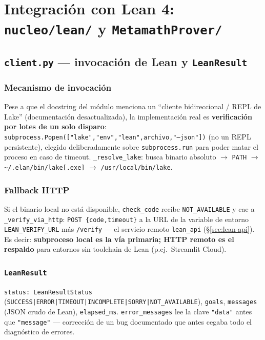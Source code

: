 \documentclass[11pt,a4paper]{report}
\newcommand{\code}[1]{\texttt{#1}}
\begin{document}
\chapter{Integraci\'on con Lean 4: \code{nucleo/lean/} y \code{MetamathProver/}}

\section{\code{client.py} --- invocaci\'on de Lean y \code{LeanResult}}

\subsection{Mecanismo de invocaci\'on}
Pese a que el docstring del m\'odulo menciona un ``cliente bidireccional / REPL de Lake'' (documentaci\'on desactualizada), la implementaci\'on real es \textbf{verificaci\'on por lotes de un solo disparo}: \code{subprocess.Popen(["lake","env","lean",archivo,"--json"])} (no un REPL persistente), elegido deliberadamente sobre \code{subprocess.run} para poder matar el proceso en caso de timeout. \code{\_resolve_lake}: busca binario absoluto $\to$ \code{PATH} $\to$ \code{\textasciitilde/.elan/bin/lake[.exe]} $\to$ \code{/usr/local/bin/lake}.

\subsection{Fallback HTTP}
Si el binario local no est\'a disponible, \code{check_code} recibe \code{NOT_AVAILABLE} y cae a \code{_verify_via_http}: \code{POST \{code,timeout\}} a la URL de la variable de entorno \code{LEAN_VERIFY_URL} más \code{/verify} --- el servicio remoto \code{lean_api} (\S\ref{sec:lean-api}). Es decir: \textbf{subproceso local es la v\'ia primaria; HTTP remoto es el respaldo} para entornos sin toolchain de Lean (p.ej.\ Streamlit Cloud).

\subsection{\code{LeanResult}}
\code{status: LeanResultStatus} (\code{SUCCESS|ERROR|TIMEOUT|INCOMPLETE|SORRY|NOT_AVAILABLE}), \code{goals}, \code{messages} (JSON crudo de Lean), \code{elapsed_ms}. \code{error_messages} lee la clave \code{"data"} antes que \code{"message"} --- correcci\'on de un bug documentado que antes cegaba todo el diagn\'ostico de errores.
\end{document}
